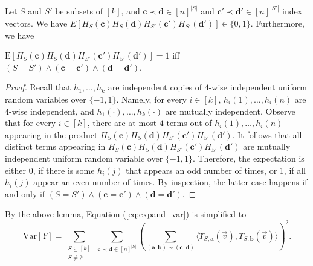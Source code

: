 \def\draft{0}  \documentclass[proceedings]{stacs}
\theoremstyle{plain}\newtheorem{satz}[thm]{Satz}
\theoremstyle{definition}\newtheorem{crucial}[thm]{Crucial Definition}
\newcommand{\vecv}{{\vec{v}} }
\newcommand{\bfa}{{\mathbf a} }
\newcommand{\bfb}{{\mathbf b} }
\newcommand{\bfc}{{\mathbf c} }
\newcommand{\bfd}{{\mathbf d} }
\newcommand{\Var}{{\mathrm{Var}} }
\newcommand{\E}{{\mathrm{E}} }
\begin{document}
\begin{lemma} \label{lem:vanish} Let $S$ and $S'$ be subsets of $[k]$, and $\bfc \prec \bfd \in [n]^{|S|}$ and $\bfc' \prec \bfd' \in [n]^{|S'|}$ index vectors. We have $E[ H_S(\bfc)H_S(\bfd)H_{S'}(\bfc')H_{S'}(\bfd')] \in \{0,1\}$.
Furthermore, we have

\noindent
$\E[ H_S(\bfc)H_S(\bfd)H_{S'}(\bfc')H_{S'}(\bfd')]  = 1$ iff $(S = S') \wedge (\bfc = \bfc') \wedge (\bfd = \bfd')$.
\end{lemma}
\begin{proof} Recall that $h_1,\dots,h_k$ are independent copies of $4$-wise independent uniform random variables over $\{ -1, 1\}$. Namely, for every $i\in[k]$, $h_i(1),\dots,h_i(n)$ are $4$-wise independent, and $h_1(\cdot),\dots,h_k(\cdot)$ are mutually independent. Observe that for every $i\in[k]$, there are at most $4$ terms out of $h_i(1),\dots,h_i(n)$ appearing in the product $H_S(\bfc)H_S(\bfd)H_{S'}(\bfc')H_{S'}(\bfd')$. It follows that all distinct terms appearing in $H_S(\bfc)H_S(\bfd)H_{S'}(\bfc')H_{S'}(\bfd')$ are mutually independent uniform random variable over $\{-1, 1\}$. Therefore, the expectation is either 0, if there is some $h_i(j)$ that appears an odd number of times, or 1, if all $h_i(j)$ appear an even number of times. By inspection, the latter case happens if and only if  $(S = S') \wedge (\bfc = \bfc') \wedge (\bfd = \bfd')$.
\end{proof}

By the above lemma, Equation (\ref{eq:expand_var}) is simplified to
\begin{equation}\label{eq:simplified_var}
\Var[Y] = \sum_{\substack{S \subseteq [k]\\ S \neq \emptyset}}\  \sum_{\bfc \prec \bfd \in [n]^{|S|}}  \left( \sum_{(\bfa,\bfb) \sim (\bfc, \bfd)} \langle \Upsilon_{S,\bfa}(\vecv),   \Upsilon_{S,\bfb}(\vecv) \rangle\right)^2.
\end{equation}
\end{document}
